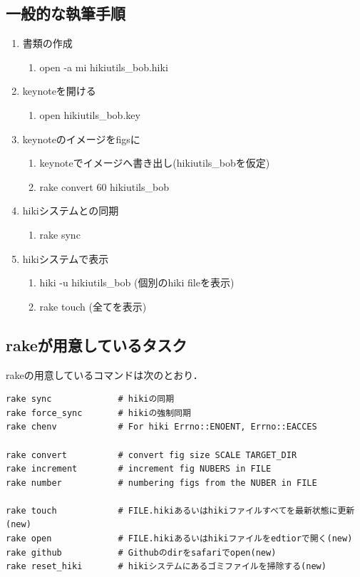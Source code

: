 \subsection{一般的な執筆手順}
\begin{enumerate}
\item 書類の作成
\begin{enumerate}
\item open -a mi hikiutils\_bob.hiki
\end{enumerate}
\item keynoteを開ける
\begin{enumerate}
\item open hikiutils\_bob.key
\end{enumerate}
\item keynoteのイメージをfigsに
\begin{enumerate}
\item keynoteでイメージへ書き出し(hikiutils\_bobを仮定)
\item rake convert 60 hikiutils\_bob
\end{enumerate}
\item hikiシステムとの同期
\begin{enumerate}
\item rake sync
\end{enumerate}
\item hikiシステムで表示
\begin{enumerate}
\item hiki -u hikiutils\_bob (個別のhiki fileを表示)
\item rake touch (全てを表示)
\end{enumerate}
\end{enumerate}
\subsection{rakeが用意しているタスク}
rakeの用意しているコマンドは次のとおり．
\begin{lstlisting}[style=customCsh,basicstyle={\scriptsize\ttfamily}]
rake sync             # hikiの同期
rake force_sync       # hikiの強制同期
rake chenv            # For hiki Errno::ENOENT, Errno::EACCES

rake convert          # convert fig size SCALE TARGET_DIR
rake increment        # increment fig NUBERS in FILE
rake number           # numbering figs from the NUBER in FILE

rake touch            # FILE.hikiあるいはhikiファイルすべてを最新状態に更新(new)
rake open             # FILE.hikiあるいはhikiファイルをedtiorで開く(new)
rake github           # Githubのdirをsafariでopen(new)
rake reset_hiki       # hikiシステムにあるゴミファイルを掃除する(new)
\end{lstlisting}
